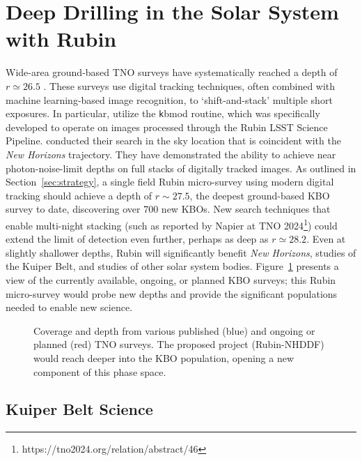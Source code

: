 \documentclass[modern,linenumbers,trackchanges,preprint]{aastex631}
\begin{document}
\section{Deep Drilling in the Solar System with Rubin}

Wide-area ground-based TNO surveys have systematically reached a depth of $r\simeq26.5$ \citep[see][for recent examples]{Fraser2024PSJ, Yoshida2024, Napier2023}.
These surveys use digital tracking techniques, often combined with machine learning-based image recognition, to `shift-and-stack' multiple short exposures.
In particular, \citet{Fraser2024PSJ} utilize the {\texttt kbmod} \citep{Smotherman2021} routine, which was specifically developed to operate on images processed through the Rubin LSST Science Pipeline.
\citet{Fraser2024PSJ} conducted their search in the sky location that is coincident with the {\it New Horizons} trajectory.
They have demonstrated the ability to achieve near photon-noise-limit depths on full stacks of digitally tracked images.
As outlined in Section~\ref{sec:strategy}, a single field Rubin micro-survey using modern digital tracking should achieve a depth of $r \sim 27.5$, the deepest ground-based KBO survey to date, discovering over 700 new KBOs. 
New search techniques that enable multi-night stacking (such as reported by Napier at TNO 2024\footnote{https://tno2024.org/relation/abstract/46}) could extend the limit of detection even further, perhaps as deep as $r\simeq28.2$.
Even at slightly shallower depths, Rubin will significantly benefit {\it New Horizons}, studies of the Kuiper Belt, and studies of other solar system bodies. 
Figure~\ref{fig-surveys} presents a view of the currently available, ongoing, or planned KBO surveys; this Rubin micro-survey would probe new depths and provide the significant populations needed to enable new science.

\begin{figure}
\caption{\label{fig-surveys}
Coverage and depth from various published (blue) and ongoing or planned (red) TNO surveys.  The proposed project (Rubin-NHDDF) would reach deeper into the KBO population, opening a new component of this phase space.
}
\end{figure}


\subsection{Kuiper Belt Science}
\end{document}
